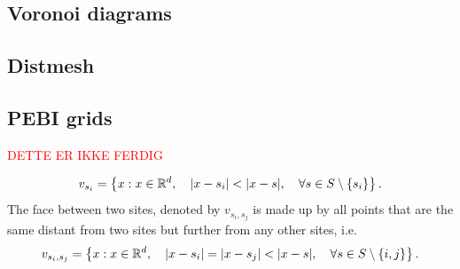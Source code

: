 \subsection{Voronoi diagrams}


\subsection{Distmesh}

\subsection{PEBI grids}
\textcolor{red}{DETTE ER IKKE FERDIG}

\begin{equation}
    v_{s_i} = \left\{ x : x \in \mathbb{R}^d,\quad \lvert x - s_i\rvert < \lvert x - s\rvert,\quad \forall s \in S \setminus \{s_i\} \right\}.
\end{equation}
The face between two sites, denoted by $v_{s_i, s_j}$ is made up by all points that are the same distant from two sites but further from any other sites, i.e.
\begin{equation}
    v_{s_i, s_j} = \left\{ x : x \in \mathbb{R}^d,\quad \lvert x - s_i\rvert = \lvert x - s_j\rvert < \lvert x - s\rvert,\quad \forall s \in S \setminus \{i, j\} \right\}.
\end{equation}

